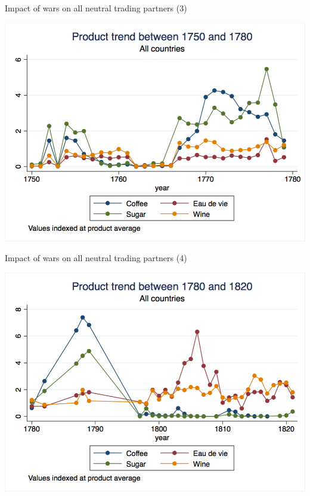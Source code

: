 \documentclass[11pt]{beamer}
\begin{document}
\begin{frame}{Impact of wars on all neutral trading partners (3)}
\begin{center}
\includegraphics[scale=.3]{allcountry_product_1780.png}
\end{center}
\end{frame}

\begin{frame}{Impact of wars on all neutral trading partners (4)}
\begin{center}
\includegraphics[scale=.3]{allcountry_product_1820.png}
\end{center}
\end{frame}
\end{document}
